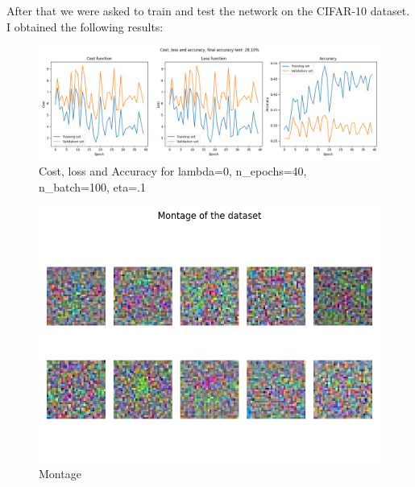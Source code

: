 \documentclass{article}
\begin{document}
After that we were asked to train and test the network on the CIFAR-10 dataset. I obtained the following results:
\begin{figure}[H]
    \centering
    \includegraphics[width=\linewidth]{Result_Pics/cost_loss_accuracy_0.0_40_100_0.1.png}
    \caption{Cost, loss and Accuracy for lambda=0, n\_epochs=40, n\_batch=100, eta=.1}
\end{figure}
\begin{figure}[H]
    \centering
    \includegraphics[scale=0.6]{Result_Pics/weights_0.0_40_100_0.1.png}
    \caption{Montage}
\end{figure}
\end{document}
